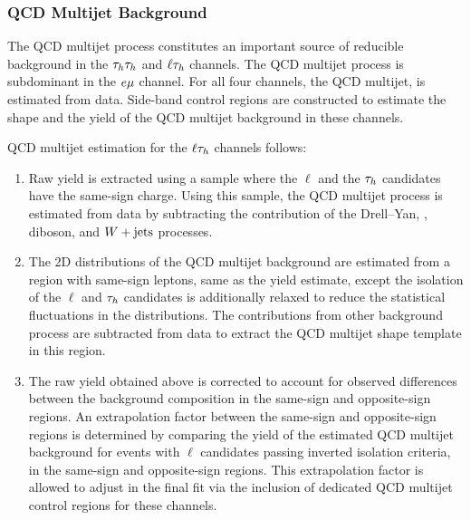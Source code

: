 \subsubsection{QCD Multijet Background}
The QCD multijet process constitutes an important source of reducible background 
in the $\tau_{h}\tau_{h}$ and $\ell\tau_{h}$ channels. The QCD multijet process is subdominant
in the $e\mu$ channel. For all four channels, the QCD multijet, is estimated from data.  
Side-band control regions are constructed to estimate the shape and the yield of the QCD multijet 
background in these channels.

QCD multijet estimation for the $\ell\tau_{h}$ channels follows:
\begin{enumerate}

\item Raw yield is extracted using a sample where the
$\ell$ and the $\tau_{h}$ candidates have the same-sign charge. Using this sample, the QCD multijet 
process is estimated from data by subtracting the contribution of the Drell--Yan, \ttbar, diboson,
and $W+\text{jets}$ processes.

\item The 2D distributions of the QCD multijet background are estimated from a region with 
same-sign leptons, same as the yield estimate, except the isolation of the $\ell$ and $\tau_{h}$ 
candidates is additionally relaxed to reduce the statistical fluctuations in the distributions. 
The contributions from other background process are subtracted from data
to extract the QCD multijet shape template in this region.

\item The raw yield obtained above is corrected to account for observed differences between the background 
composition in the same-sign and opposite-sign regions. An extrapolation factor between the same-sign 
and opposite-sign regions is determined by comparing the yield of the estimated QCD multijet background for 
events with $\ell$ candidates passing inverted isolation criteria, in the same-sign and opposite-sign 
regions. This extrapolation factor is allowed to adjust in the final fit via the inclusion of dedicated QCD
multijet control regions for these channels.
\end{enumerate}

